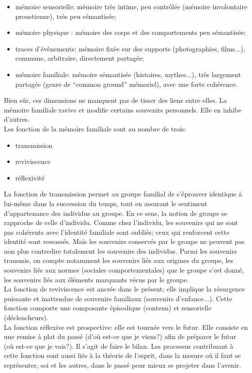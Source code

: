\documentclass[french]{article}
\begin{document}
			\begin{itemize}
				\item mémoire sensorielle: mémoire très intime, peu contrôlée (mémoire involontaire proustienne), très peu sémantisée;
				\item mémoire physique : mémoire des corps et des comportements peu sémantisée;
				\item traces d'évènements: mémoire fixée sur des supports (photographies, films...), commune, arbitraire, directement partagée;
				\item mémoire familiale: mémoire sémantisée (histoires, mythes...), très largement partagée (genre de ``common ground'' mémoriel), avec une forte cohérence.
			\end{itemize}
			Bien sûr, ces dimensions ne manquent pas de tisser des liens entre elles. La mémoire familiale ravive et modifie certains souvenirs personnels. Elle en inhibe d'autres.\\
			Les fonction de la mémoire familiale sont au nombre de trois:
			\begin{itemize}
				\item transmission
				\item reviviscence
				\item réflexivité
			\end{itemize}
			La fonction de transmission permet au groupe familial de s'éprouver identique à lui-même dans la succession du temps, tout en assurant le sentiment d'appartenance des individus au groupe. En ce sens, la notion de groupe se rapproche de celle d'individu. Comme chez l'individu, les souvenirs qui ne sont pas cohérents avec l'identité familiale sont oubliés; ceux qui renforcent cette identité sont ressassés. Mais les souvenirs conservés par le groupe ne peuvent pas non plus contredire totalement les souvenirs des individus. Parmi les souvenirs transmis, on compte notamment les souvenirs liés aux origines du groupe, les souvenirs liés aux normes (sociales comportementales) que le groupe s'est donné, les souvenirs liés aux éléments marquants vécus par le groupe.\\
			La fonction de reviviscence est ancrée dans le présent; elle implique la résurgence puissante et inattendue de souvenirs familiaux (souvenirs d'enfance...). Cette fonction comporte une composante épisodique (contenu) et sensorielle (déclencheurs).\\
			La fonction réflexive est prospective: elle est tournée vers le futur. Elle consiste en une remise à plat du passé (d'où est-ce que je viens?) afin de préparer le futur (où est-ce que je vais?). Il s'agit de faire le bilan. Les processus contribuant à cette fonction sont aussi liés à la théorie de l'esprit, dans la mesure où il faut se représenter, soi et les autres, dans le passé pour mieux se projeter dans l'avenir. \\
			
\end{document}

